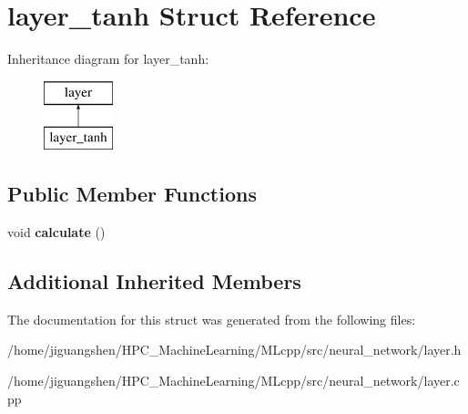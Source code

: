 \hypertarget{structlayer__tanh}{\section{layer\-\_\-tanh Struct Reference}
\label{structlayer__tanh}
}
Inheritance diagram for layer\-\_\-tanh\-:\begin{figure}[H]
\begin{center}
\leavevmode
\includegraphics[height=2.000000cm]{structlayer__tanh}
\end{center}
\end{figure}
\subsection*{Public Member Functions}
\begin{DoxyCompactItemize}
\item 
\hypertarget{structlayer__tanh_aa06a41d4ddfa798cafd99cf1e22f1a48}{void {\bfseries calculate} ()}\label{structlayer__tanh_aa06a41d4ddfa798cafd99cf1e22f1a48}

\end{DoxyCompactItemize}
\subsection*{Additional Inherited Members}


The documentation for this struct was generated from the following files\-:\begin{DoxyCompactItemize}
\item 
/home/jiguangshen/\-H\-P\-C\-\_\-\-Machine\-Learning/\-M\-Lcpp/src/neural\-\_\-network/layer.\-h\item 
/home/jiguangshen/\-H\-P\-C\-\_\-\-Machine\-Learning/\-M\-Lcpp/src/neural\-\_\-network/layer.\-cpp\end{DoxyCompactItemize}
